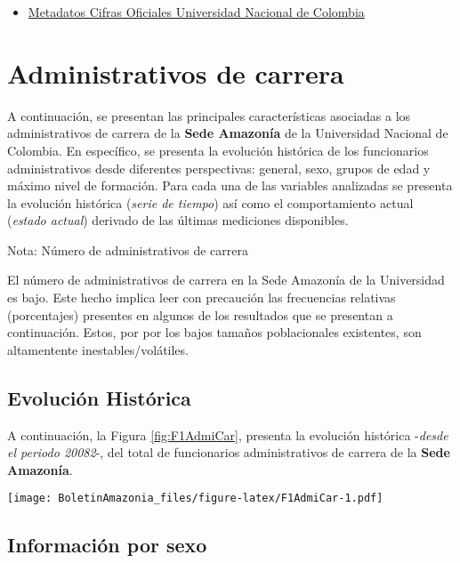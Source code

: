 \documentclass[
]{book}
\providecommand{\tightlist}{%
  \setlength{\itemsep}{0pt}\setlength{\parskip}{0pt}}
\begin{document}
\begin{itemize}
\tightlist
\item
  \href{http://estadisticas.unal.edu.co/menu-principal/cifras-generales/metadatos/cifras-generales/}{Metadatos Cifras Oficiales Universidad Nacional de Colombia}
\end{itemize}

\hypertarget{AdmCar}{%
\section{Administrativos de carrera}\label{AdmCar}}

A continuación, se presentan las principales características asociadas a los administrativos de carrera de la \textbf{Sede Amazonía} de la Universidad Nacional de Colombia. En específico, se presenta la evolución histórica de los funcionarios administrativos desde diferentes perspectivas: general, sexo, grupos de edad y máximo nivel de formación. Para cada una de las variables analizadas se presenta la evolución histórica (\emph{serie de tiempo}) así como el comportamiento actual (\emph{estado actual}) derivado de las últimas mediciones disponibles.

Nota: Número de administrativos de carrera

El número de administrativos de carrera en la Sede Amazonía de la Universidad es bajo. Este hecho implica leer con precaución las frecuencias relativas (porcentajes) presentes en algunos de los resultados que se presentan a continuación. Estos, por por los bajos tamaños poblacionales existentes, son altamentente inestables/volátiles.

\hypertarget{evoluciuxf3n-histuxf3rica-11}{%
\subsection{Evolución Histórica}\label{evoluciuxf3n-histuxf3rica-11}}

A continuación, la Figura \ref{fig:F1AdmiCar}, presenta la evolución histórica -\emph{desde el periodo 20082}-, del total de funcionarios administrativos de carrera de la \textbf{Sede Amazonía}.

\texttt{[image: BoletinAmazonia\_files/figure-latex/F1AdmiCar-1.pdf]}

\hypertarget{informaciuxf3n-por-sexo-11}{%
\subsection{Información por sexo}\label{informaciuxf3n-por-sexo-11}}
\end{document}
